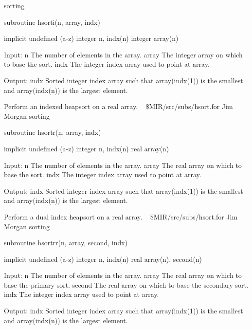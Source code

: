 \newline {} sorting
\par{\tenpoint
{\eightpoint\begintt
      subroutine hsorti(n, array, indx)

      implicit undefined (a-z)
      integer n, indx(n)
      integer array(n)

     Input:
       n        The number of elements in the array.
       array    The integer array on which to base the sort.
       indx     The integer index array used to point at array.

     Output:
       indx     Sorted integer index array such that array(indx(1)) is
                the smallest and array(indx(n)) is the largest element.
\endtt}
\par}
%
\noindent Perform an indexed heapsort on a real array.
\newline \ 
\newline {} \$MIR/src/subs/hsort.for
\newline {} Jim Morgan
\newline {} sorting
\par{\tenpoint
{\eightpoint\begintt
      subroutine hsortr(n, array, indx)

      implicit undefined (a-z)
      integer n, indx(n)
      real array(n)

     Input:
       n        The number of elements in the array.
       array    The real array on which to base the sort.
       indx     The integer index array used to point at array.

     Output:
       indx     Sorted integer index array such that array(indx(1)) is
                the smallest and array(indx(n)) is the largest element.
\endtt}
\par}
%
\noindent Perform a dual index heapsort on a real array.
\newline \ 
\newline {} \$MIR/src/subs/hsort.for
\newline {} Jim Morgan
\newline \abox{Keywords:} sorting
\par{\tenpoint
{\eightpoint\begintt
      subroutine hsortrr(n, array, second, indx)

      implicit undefined (a-z)
      integer n, indx(n)
      real array(n), second(n)

     Input:
       n        The number of elements in the array.
       array    The real array on which to base the primary sort.
       second   The real array on which to base the secondary sort.
       indx     The integer index array used to point at array.

     Output:
       indx     Sorted integer index array such that array(indx(1)) is
                the smallest and array(indx(n)) is the largest element.
\endtt}
\par}
